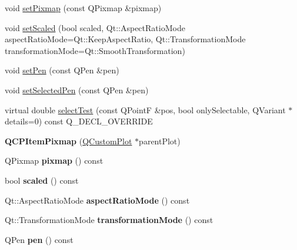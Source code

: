 \begin{DoxyCompactItemize}
\item 
void \hyperlink{class_q_c_p_item_pixmap_a726b69ea4025edf48f9b29b6450548a7}{set\+Pixmap} (const Q\+Pixmap \&pixmap)
\item 
void \hyperlink{class_q_c_p_item_pixmap_ab4d44529a1c6c8d37d0ea7560e042777}{set\+Scaled} (bool scaled, Qt\+::\+Aspect\+Ratio\+Mode aspect\+Ratio\+Mode=Qt\+::\+Keep\+Aspect\+Ratio, Qt\+::\+Transformation\+Mode transformation\+Mode=Qt\+::\+Smooth\+Transformation)
\item 
void \hyperlink{class_q_c_p_item_pixmap_acdade1305edb4b5cae14f97fd132065f}{set\+Pen} (const Q\+Pen \&pen)
\item 
void \hyperlink{class_q_c_p_item_pixmap_afc5e479e88e53740176ce77cb70dd67a}{set\+Selected\+Pen} (const Q\+Pen \&pen)
\item 
virtual double \hyperlink{class_q_c_p_item_pixmap_a65d1ede7bb479b90d40186d083071947}{select\+Test} (const Q\+PointF \&pos, bool only\+Selectable, Q\+Variant $\ast$details=0) const Q\+\_\+\+D\+E\+C\+L\+\_\+\+O\+V\+E\+R\+R\+I\+DE
\item 
{\bfseries Q\+C\+P\+Item\+Pixmap} (\hyperlink{class_q_custom_plot}{Q\+Custom\+Plot} $\ast$parent\+Plot)\hypertarget{class_q_c_p_item_pixmap_aa6de42a37261b21a5480e7da122345c3}{}\label{class_q_c_p_item_pixmap_aa6de42a37261b21a5480e7da122345c3}

\item 
Q\+Pixmap {\bfseries pixmap} () const \hypertarget{class_q_c_p_item_pixmap_a73dea89e0eb45127a2705e2c7991b8d8}{}\label{class_q_c_p_item_pixmap_a73dea89e0eb45127a2705e2c7991b8d8}

\item 
bool {\bfseries scaled} () const \hypertarget{class_q_c_p_item_pixmap_a54026b89dff3c60376c2360f01b6fb83}{}\label{class_q_c_p_item_pixmap_a54026b89dff3c60376c2360f01b6fb83}

\item 
Qt\+::\+Aspect\+Ratio\+Mode {\bfseries aspect\+Ratio\+Mode} () const \hypertarget{class_q_c_p_item_pixmap_ac5b95c097169e107a61eebbb7c77523c}{}\label{class_q_c_p_item_pixmap_ac5b95c097169e107a61eebbb7c77523c}

\item 
Qt\+::\+Transformation\+Mode {\bfseries transformation\+Mode} () const \hypertarget{class_q_c_p_item_pixmap_a1d4751a7b9588354fc8e726d891153f7}{}\label{class_q_c_p_item_pixmap_a1d4751a7b9588354fc8e726d891153f7}

\item 
Q\+Pen {\bfseries pen} () const \hypertarget{class_q_c_p_item_pixmap_ab2b821c80cfade589472e933b9c4361f}{}\label{class_q_c_p_item_pixmap_ab2b821c80cfade589472e933b9c4361f}


\end{DoxyCompactItemize}
